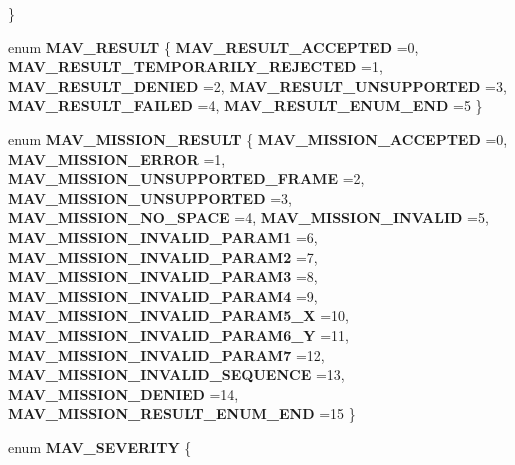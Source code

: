 \begin{DoxyCompactItemize}
 \}
\item 
enum \textbf{ M\+A\+V\+\_\+\+R\+E\+S\+U\+LT} \{ \newline
\textbf{ M\+A\+V\+\_\+\+R\+E\+S\+U\+L\+T\+\_\+\+A\+C\+C\+E\+P\+T\+ED} =0, 
\textbf{ M\+A\+V\+\_\+\+R\+E\+S\+U\+L\+T\+\_\+\+T\+E\+M\+P\+O\+R\+A\+R\+I\+L\+Y\+\_\+\+R\+E\+J\+E\+C\+T\+ED} =1, 
\textbf{ M\+A\+V\+\_\+\+R\+E\+S\+U\+L\+T\+\_\+\+D\+E\+N\+I\+ED} =2, 
\textbf{ M\+A\+V\+\_\+\+R\+E\+S\+U\+L\+T\+\_\+\+U\+N\+S\+U\+P\+P\+O\+R\+T\+ED} =3, 
\newline
\textbf{ M\+A\+V\+\_\+\+R\+E\+S\+U\+L\+T\+\_\+\+F\+A\+I\+L\+ED} =4, 
\textbf{ M\+A\+V\+\_\+\+R\+E\+S\+U\+L\+T\+\_\+\+E\+N\+U\+M\+\_\+\+E\+ND} =5
 \}
\item 
enum \textbf{ M\+A\+V\+\_\+\+M\+I\+S\+S\+I\+O\+N\+\_\+\+R\+E\+S\+U\+LT} \{ \newline
\textbf{ M\+A\+V\+\_\+\+M\+I\+S\+S\+I\+O\+N\+\_\+\+A\+C\+C\+E\+P\+T\+ED} =0, 
\textbf{ M\+A\+V\+\_\+\+M\+I\+S\+S\+I\+O\+N\+\_\+\+E\+R\+R\+OR} =1, 
\textbf{ M\+A\+V\+\_\+\+M\+I\+S\+S\+I\+O\+N\+\_\+\+U\+N\+S\+U\+P\+P\+O\+R\+T\+E\+D\+\_\+\+F\+R\+A\+ME} =2, 
\textbf{ M\+A\+V\+\_\+\+M\+I\+S\+S\+I\+O\+N\+\_\+\+U\+N\+S\+U\+P\+P\+O\+R\+T\+ED} =3, 
\newline
\textbf{ M\+A\+V\+\_\+\+M\+I\+S\+S\+I\+O\+N\+\_\+\+N\+O\+\_\+\+S\+P\+A\+CE} =4, 
\textbf{ M\+A\+V\+\_\+\+M\+I\+S\+S\+I\+O\+N\+\_\+\+I\+N\+V\+A\+L\+ID} =5, 
\textbf{ M\+A\+V\+\_\+\+M\+I\+S\+S\+I\+O\+N\+\_\+\+I\+N\+V\+A\+L\+I\+D\+\_\+\+P\+A\+R\+A\+M1} =6, 
\textbf{ M\+A\+V\+\_\+\+M\+I\+S\+S\+I\+O\+N\+\_\+\+I\+N\+V\+A\+L\+I\+D\+\_\+\+P\+A\+R\+A\+M2} =7, 
\newline
\textbf{ M\+A\+V\+\_\+\+M\+I\+S\+S\+I\+O\+N\+\_\+\+I\+N\+V\+A\+L\+I\+D\+\_\+\+P\+A\+R\+A\+M3} =8, 
\textbf{ M\+A\+V\+\_\+\+M\+I\+S\+S\+I\+O\+N\+\_\+\+I\+N\+V\+A\+L\+I\+D\+\_\+\+P\+A\+R\+A\+M4} =9, 
\textbf{ M\+A\+V\+\_\+\+M\+I\+S\+S\+I\+O\+N\+\_\+\+I\+N\+V\+A\+L\+I\+D\+\_\+\+P\+A\+R\+A\+M5\+\_\+X} =10, 
\textbf{ M\+A\+V\+\_\+\+M\+I\+S\+S\+I\+O\+N\+\_\+\+I\+N\+V\+A\+L\+I\+D\+\_\+\+P\+A\+R\+A\+M6\+\_\+Y} =11, 
\newline
\textbf{ M\+A\+V\+\_\+\+M\+I\+S\+S\+I\+O\+N\+\_\+\+I\+N\+V\+A\+L\+I\+D\+\_\+\+P\+A\+R\+A\+M7} =12, 
\textbf{ M\+A\+V\+\_\+\+M\+I\+S\+S\+I\+O\+N\+\_\+\+I\+N\+V\+A\+L\+I\+D\+\_\+\+S\+E\+Q\+U\+E\+N\+CE} =13, 
\textbf{ M\+A\+V\+\_\+\+M\+I\+S\+S\+I\+O\+N\+\_\+\+D\+E\+N\+I\+ED} =14, 
\textbf{ M\+A\+V\+\_\+\+M\+I\+S\+S\+I\+O\+N\+\_\+\+R\+E\+S\+U\+L\+T\+\_\+\+E\+N\+U\+M\+\_\+\+E\+ND} =15
 \}
\item 
enum \textbf{ M\+A\+V\+\_\+\+S\+E\+V\+E\+R\+I\+TY} \{ \newline

\end{DoxyCompactItemize}
